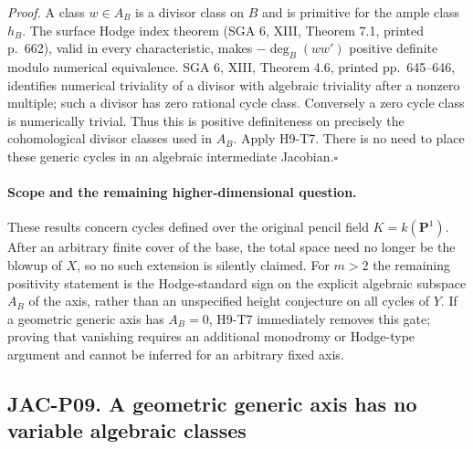 \documentclass[11pt,a4paper]{article}
\begin{document}
\emph{Proof.} A class $w\in A_B$ is a divisor class on $B$ and is
primitive for the ample class $h_B$. The surface Hodge index theorem
(SGA 6, XIII, Theorem 7.1, printed p.~662), valid in every
characteristic, makes $-\deg_B(ww')$ positive definite modulo numerical
equivalence. SGA 6, XIII, Theorem 4.6, printed pp.~645--646, identifies
numerical triviality of a divisor with algebraic triviality after a
nonzero multiple; such a divisor has zero rational cycle class.
Conversely a zero cycle class is numerically trivial. Thus this is
positive definiteness on precisely the cohomological divisor classes
used in $A_B$. Apply H9-T7. There is
no need to place these generic cycles in an algebraic intermediate
Jacobian.\hfill$\square$

\paragraph{Scope and the remaining higher-dimensional question.}
These results concern cycles defined over the original pencil field
$K=k(\mathbf P^1)$. After an arbitrary finite cover of the base, the
total space need no longer be the blowup of $X$, so no such extension is
silently claimed. For $m>2$ the remaining positivity statement is the
Hodge-standard sign on the explicit algebraic subspace $A_B$ of the
axis, rather than an unspecified height conjecture on all cycles of
$Y$. If a geometric generic axis has $A_B=0$, H9-T7 immediately removes
this gate; proving that vanishing requires an additional monodromy or
Hodge-type argument and cannot be inferred for an arbitrary fixed axis.



\subsection*{JAC-P09. A geometric generic axis has no variable algebraic classes}
\end{document}
